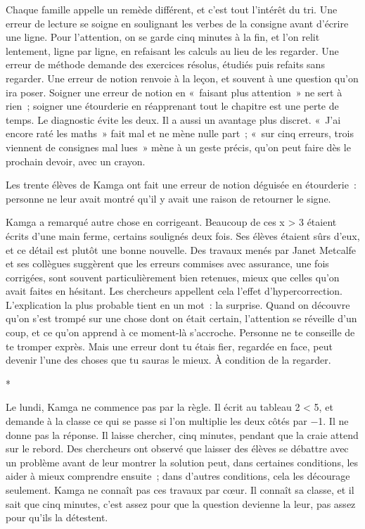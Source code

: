 \documentclass[10.5pt,twoside,openright]{book}
\newcommand{\asterisme}{\par\vspace{0.7em}\centerline{\color{gris}*\quad*\quad*}\vspace{0.7em}\par\noindent}
\begin{document}
Chaque famille appelle un remède différent, et c’est tout l’intérêt du tri. Une erreur de lecture se soigne en soulignant les verbes de la consigne avant d’écrire une ligne. Pour l’attention, on se garde cinq minutes à la fin, et l’on relit lentement, ligne par ligne, en refaisant les calculs au lieu de les regarder. Une erreur de méthode demande des exercices résolus, étudiés puis refaits sans regarder. Une erreur de notion renvoie à la leçon, et souvent à une question qu’on ira poser. Soigner une erreur de notion en « faisant plus attention » ne sert à rien ; soigner une étourderie en réapprenant tout le chapitre est une perte de temps. Le diagnostic évite les deux. Il a aussi un avantage plus discret. « J’ai encore raté les maths » fait mal et ne mène nulle part ; « sur cinq erreurs, trois viennent de consignes mal lues » mène à un geste précis, qu’on peut faire dès le prochain devoir, avec un crayon.

Les trente élèves de Kamga ont fait une erreur de notion déguisée en étourderie : personne ne leur avait montré qu’il y avait une raison de retourner le signe.

Kamga a remarqué autre chose en corrigeant. Beaucoup de ces x > 3 étaient écrits d’une main ferme, certains soulignés deux fois. Ses élèves étaient sûrs d’eux, et ce détail est plutôt une bonne nouvelle. Des travaux menés par Janet Metcalfe et ses collègues suggèrent que les erreurs commises avec assurance, une fois corrigées, sont souvent particulièrement bien retenues, mieux que celles qu’on avait faites en hésitant. Les chercheurs appellent cela l’effet d’hypercorrection. L’explication la plus probable tient en un mot : la surprise. Quand on découvre qu’on s’est trompé sur une chose dont on était certain, l’attention se réveille d’un coup, et ce qu’on apprend à ce moment-là s’accroche. Personne ne te conseille de te tromper exprès. Mais une erreur dont tu étais fier, regardée en face, peut devenir l’une des choses que tu sauras le mieux. À condition de la regarder.

\asterisme

Le lundi, Kamga ne commence pas par la règle. Il écrit au tableau 2 < 5, et demande à la classe ce qui se passe si l’on multiplie les deux côtés par −1. Il ne donne pas la réponse. Il laisse chercher, cinq minutes, pendant que la craie attend sur le rebord. Des chercheurs ont observé que laisser des élèves se débattre avec un problème avant de leur montrer la solution peut, dans certaines conditions, les aider à mieux comprendre ensuite ; dans d’autres conditions, cela les décourage seulement. Kamga ne connaît pas ces travaux par cœur. Il connaît sa classe, et il sait que cinq minutes, c’est assez pour que la question devienne la leur, pas assez pour qu’ils la détestent.
\end{document}
